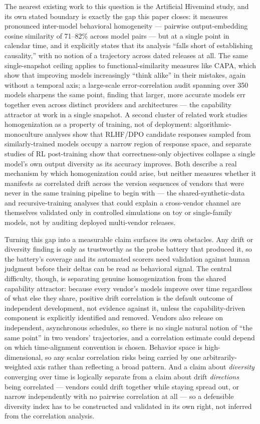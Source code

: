 \documentclass[11pt]{article}
\begin{document}
The nearest existing work to this question is the Artificial Hivemind study, and its own stated boundary is exactly the gap this paper closes: it measures pronounced inter-model behavioral homogeneity --- pairwise output-embedding cosine similarity of 71--82\% across model pairs --- but at a single point in calendar time, and it explicitly states that its analysis ``falls short of establishing causality,'' with no notion of a trajectory across dated releases at all. The same single-snapshot ceiling applies to functional-similarity measures like CAPA, which show that improving models increasingly ``think alike'' in their mistakes, again without a temporal axis; a large-scale error-correlation audit spanning over 350 models sharpens the same point, finding that larger, more accurate models err together even across distinct providers and architectures \citep{CorrelatedErrors2506} --- the capability attractor at work in a single snapshot. A second cluster of related work studies homogenization as a property of training, not of deployment: algorithmic-monoculture analyses show that RLHF/DPO candidate responses sampled from similarly-trained models occupy a narrow region of response space, and separate studies of RL post-training show that correctness-only objectives collapse a single model's own output diversity as its accuracy improves. Both describe a real mechanism by which homogenization could arise, but neither measures whether it manifests as correlated drift across the version sequences of vendors that were never in the same training pipeline to begin with --- the shared-synthetic-data and recursive-training analyses that could explain a cross-vendor channel are themselves validated only in controlled simulations on toy or single-family models, not by auditing deployed multi-vendor releases.

Turning this gap into a measurable claim surfaces its own obstacles. Any drift or diversity finding is only as trustworthy as the probe battery that produced it, so the battery's coverage and its automated scorers need validation against human judgment before their deltas can be read as behavioral signal. The central difficulty, though, is separating genuine homogenization from the shared capability attractor: because every vendor's models improve over time regardless of what else they share, positive drift correlation is the default outcome of independent development, not evidence against it, unless the capability-driven component is explicitly identified and removed. Vendors also release on independent, asynchronous schedules, so there is no single natural notion of ``the same point'' in two vendors' trajectories, and a correlation estimate could depend on which time-alignment convention is chosen. Behavior space is high-dimensional, so any scalar correlation risks being carried by one arbitrarily-weighted axis rather than reflecting a broad pattern. And a claim about \emph{diversity} converging over time is logically separate from a claim about drift \emph{directions} being correlated --- vendors could drift together while staying spread out, or narrow independently with no pairwise correlation at all --- so a defensible diversity index has to be constructed and validated in its own right, not inferred from the correlation analysis.
\end{document}
